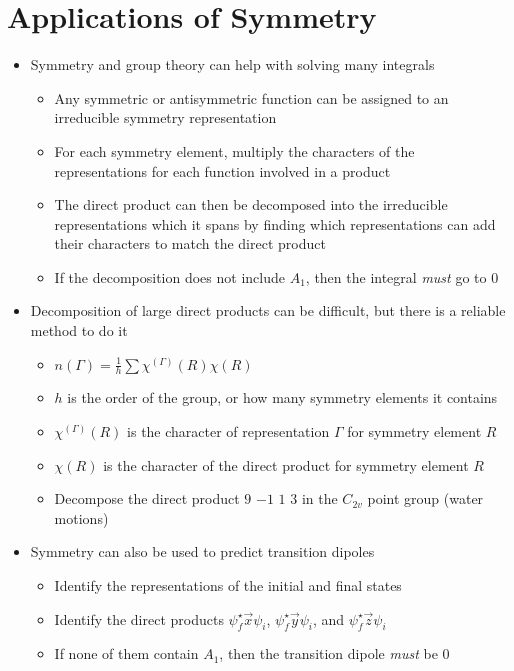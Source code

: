 \documentclass[12pt, openany, letterpaper]{memoir}
\begin{document}
\section{Applications of Symmetry}
\begin{itemize}
	\item Symmetry and group theory can help with solving many integrals
	\begin{itemize}
		\item Any symmetric or antisymmetric function can be assigned to an irreducible symmetry representation
		\item For each symmetry element, multiply the characters of the representations for each function involved in a product
		\item The direct product can then be decomposed into the irreducible representations which it spans by finding which representations can add their characters to match the direct product
		\item If the decomposition does not include $A_1$, then the integral \emph{must} go to $0$
	\end{itemize}
	\item Decomposition of large direct products can be difficult, but there is a reliable method to do it
	\begin{itemize}
		\item $n(\Gamma)=\frac{1}{h}\displaystyle\sum\chi^{(\Gamma)}(R)\chi(R)$
		\item $h$ is the order of the group, or how many symmetry elements it contains
		\item $\chi^{(\Gamma)}(R)$ is the character of representation $\Gamma$ for symmetry element $R$
		\item $\chi(R)$ is the character of the direct product for symmetry element $R$
		\item Decompose the direct product $9$ $-1$ $1$ $3$ in the $C_{2v}$ point group (water motions)
	\end{itemize}
	\item Symmetry can also be used to predict transition dipoles
	\begin{itemize}
		\item Identify the representations of the initial and final states
		\item Identify the direct products $\psi_f^\star \vec{x}\psi_i$,  $\psi_f^\star \vec{y}\psi_i$, and $\psi_f^\star \vec{z}\psi_i$
		\item If none of them contain $A_1$, then the transition dipole \emph{must} be $0$
	\end{itemize}
\end{itemize}
\end{document}

